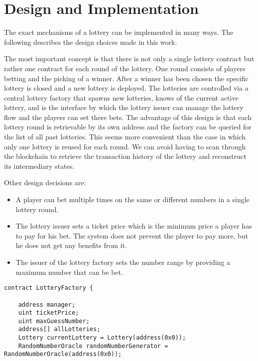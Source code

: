 \chapter{Design and Implementation}



The exact mechanisms of a lottery can be implemented in many ways. The following
describes the design choices made in this work.

The most important concept is that there is not only a single lottery contract
but rather one contract for each round of the lottery. One round consists of
players betting and the picking of a winner. After a winner has been chosen the
specific lottery is closed and a new lottery is deployed. The lotteries are
controlled via a central lottery factory that spawns new lotteries, knows of the
current active lottery, and is the interface by which the lottery issuer can
manage the lottery flow and the players can set there bets.
The advantage of this design is that each lottery round is retrievable by its own
address and the factory can be queried for the list of all past lotteries. This
seems more convenient than the case in which only one lottery is reused for each
round. We can avoid having to scan through the blockchain to retrieve the
transaction history of the lottery and reconstruct its intermediary states.

Other design decisions are:
\begin{itemize}
  \item A player can bet multiple times on the same or different numbers in a
  single lottery round.
  \item The lottery issuer sets a ticket price which is the minimum price a player
  has to pay for his bet. The system does not prevent the player to pay more,
  but he does not get any benefits from it.
  \item The issuer of the lottery factory sets the number range by providing a
  maximum number that can be bet.
\end{itemize}


\begin{Verbatim}[fontsize=\small]
contract LotteryFactory {

    address manager;
    uint ticketPrice;
    uint maxGuessNumber;
    address[] allLotteries;
    Lottery currentLottery = Lottery(address(0x0));
    RandomNumberOracle randomNumberGenerator = RandomNumberOracle(address(0x0));
\end{Verbatim}

